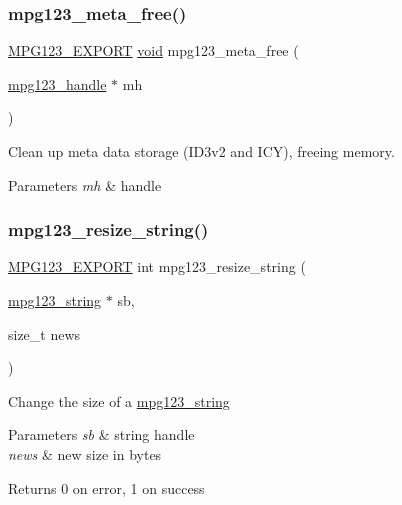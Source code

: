 \subsubsection{\texorpdfstring{mpg123\_meta\_free()}{mpg123\_meta\_free()}}
{\footnotesize\ttfamily \mbox{\hyperlink{mpg123_8h_a2ba98cfba3f760879df70e755b2a61cc}{M\+P\+G123\+\_\+\+E\+X\+P\+O\+RT}} \mbox{\hyperlink{_s_d_l__opengles2__gl2ext_8h_ae5d8fa23ad07c48bb609509eae494c95}{void}} mpg123\+\_\+meta\+\_\+free (\begin{DoxyParamCaption}\item[{\mbox{\hyperlink{group__mpg123__init_ga6728e2839a395f3a07d4514da659faca}{mpg123\+\_\+handle}} $\ast$}]{mh }\end{DoxyParamCaption})}

Clean up meta data storage (I\+D3v2 and I\+CY), freeing memory. 
\begin{DoxyParams}{Parameters}
{\em mh} & handle \\
\hline
\end{DoxyParams}
\mbox{\label{group__mpg123__metadata_ga57ddead33785908618a5c0c7f3c1895a}} 
\subsubsection{\texorpdfstring{mpg123\_resize\_string()}{mpg123\_resize\_string()}}
{\footnotesize\ttfamily \mbox{\hyperlink{mpg123_8h_a2ba98cfba3f760879df70e755b2a61cc}{M\+P\+G123\+\_\+\+E\+X\+P\+O\+RT}} int mpg123\+\_\+resize\+\_\+string (\begin{DoxyParamCaption}\item[{\mbox{\hyperlink{structmpg123__string}{mpg123\+\_\+string}} $\ast$}]{sb,  }\item[{size\+\_\+t}]{news }\end{DoxyParamCaption})}

Change the size of a \mbox{\hyperlink{structmpg123__string}{mpg123\+\_\+string}} 
\begin{DoxyParams}{Parameters}
{\em sb} & string handle \\
\hline
{\em news} & new size in bytes \\
\hline
\end{DoxyParams}
\begin{DoxyReturn}{Returns}
0 on error, 1 on success 
\end{DoxyReturn}
\mbox{\label{group__mpg123__metadata_ga96e9070d26d63c02c3f22caa0d339f26}} 

